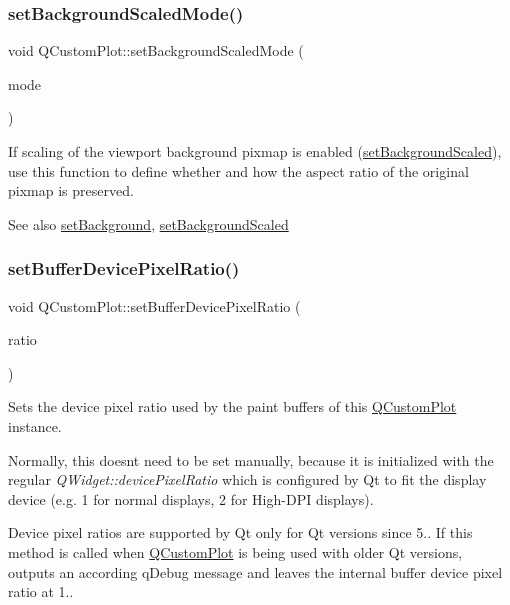 \subsubsection{\texorpdfstring{set\+Background\+Scaled\+Mode()}{setBackgroundScaledMode()}}
{\footnotesize\ttfamily void Q\+Custom\+Plot\+::set\+Background\+Scaled\+Mode (\begin{DoxyParamCaption}\item[{Qt\+::\+Aspect\+Ratio\+Mode}]{mode }\end{DoxyParamCaption})}

If scaling of the viewport background pixmap is enabled (\hyperlink{classQCustomPlot_a36f0fa1317325dc7b7efea615ee2de1f}{set\+Background\+Scaled}), use this function to define whether and how the aspect ratio of the original pixmap is preserved.

\begin{DoxySeeAlso}{See also}
\hyperlink{classQCustomPlot_a130358592cfca353ff3cf5571b49fb00}{set\+Background}, \hyperlink{classQCustomPlot_a36f0fa1317325dc7b7efea615ee2de1f}{set\+Background\+Scaled} 
\end{DoxySeeAlso}
\mbox{\label{classQCustomPlot_a159162653ad6f8b8bf21263ba5787215}} 
\subsubsection{\texorpdfstring{set\+Buffer\+Device\+Pixel\+Ratio()}{setBufferDevicePixelRatio()}}
{\footnotesize\ttfamily void Q\+Custom\+Plot\+::set\+Buffer\+Device\+Pixel\+Ratio (\begin{DoxyParamCaption}\item[{double}]{ratio }\end{DoxyParamCaption})}

Sets the device pixel ratio used by the paint buffers of this \hyperlink{classQCustomPlot}{Q\+Custom\+Plot} instance.

Normally, this doesn\textquotesingle{}t need to be set manually, because it is initialized with the regular {\itshape Q\+Widget\+::device\+Pixel\+Ratio} which is configured by Qt to fit the display device (e.\+g. 1 for normal displays, 2 for High-\/\+D\+PI displays).

Device pixel ratios are supported by Qt only for Qt versions since 5.. If this method is called when \hyperlink{classQCustomPlot}{Q\+Custom\+Plot} is being used with older Qt versions, outputs an according q\+Debug message and leaves the internal buffer device pixel ratio at 1.. \mbox{\label{classQCustomPlot_a73a6dc47c653bb6f8f030abca5a11852}} 

